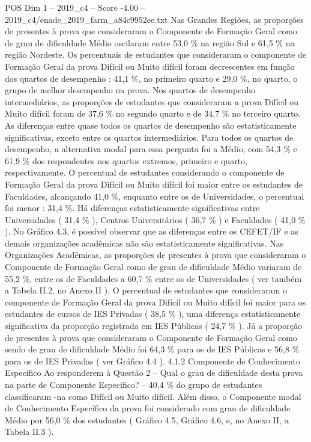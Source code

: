 \begin{textsample}{POS Dim 1 – 2019\_c4 – Score -4.00 – 2019\_c4/enade\_2019\_farm\_a84c9952ee.txt}
Nas Grandes Regiões, as proporções de presentes à prova que consideraram o Componente de Formação Geral como de grau de dificuldade Médio oscilaram entre 53,0 \% na região Sul e 61,5 \% na região Nordeste.
Os percentuais de estudantes que consideraram o componente de Formação Geral da prova Difícil ou Muito difícil foram decrescentes em função dos quartos de desempenho : 41,1 \%, no primeiro quarto e 29,0 \%, no quarto, o grupo de melhor desempenho na prova.
Nos quartos de desempenho intermediários, as proporções de estudantes que consideraram a prova Difícil ou Muito difícil foram de 37,6 \% no segundo quarto e de 34,7 \% no terceiro quarto.
As diferenças entre quase todos os quartos de desempenho são estatisticamente significativas, exceto entre os quartos intermediários.
Para todos os quartos de desempenho, a alternativa modal para essa pergunta foi a Médio, com 54,3 \% e 61,9 \% dos respondentes nos quartos extremos, primeiro e quarto, respectivamente.
O percentual de estudantes considerando o componente de Formação Geral da prova Difícil ou Muito difícil foi maior entre os estudantes de Faculdades, alcançando 41,0 \%, enquanto entre os de Universidades, o percentual foi menor : 31,4 \%.
Há diferenças estatisticamente significativas entre Universidades ( 31,4 \% ), Centros Universitários ( 36,7 \% ) e Faculdades ( 41,0 \% ).
No Gráfico 4.3, é possível observar que as diferenças entre os CEFET/IF e as demais organizações acadêmicas não são estatisticamente significativas.
Nas Organizações Acadêmicas, as proporções de presentes à prova que consideraram o Componente de Formação Geral como de grau de dificuldade Médio variaram de 55,2 \%, entre os de Faculdades a 60,7 \% entre os de Universidades ( ver também a Tabela II.2, no Anexo II ).
O percentual de estudantes que consideraram o componente de Formação Geral da prova Difícil ou Muito difícil foi maior para os estudantes de cursos de IES Privadas ( 38,5 \% ), uma diferença estatisticamente significativa da proporção registrada em IES Públicas ( 24,7 \% ).
Já a proporção de presentes à prova que consideraram o Componente de Formação Geral como sendo de grau de dificuldade Médio foi 64,3 \% para os de IES Públicas e 56,8 \% para os de IES Privadas ( ver Gráfico 4.4 ). 4.1.2 Componente de Conhecimento Específico Ao responderem à Questão 2 – Qual o grau de dificuldade desta prova na parte de Componente Específico? – 40,4 \% do grupo de estudantes classificaram -na como Difícil ou Muito difícil.
Além disso, o Componente modal de Conhecimento Específico da prova foi considerado com grau de dificuldade Médio por 56,0 \% dos estudantes ( Gráfico 4.5, Gráfico 4.6, e, no Anexo II, a Tabela II.3 ).

\end{textsample}
